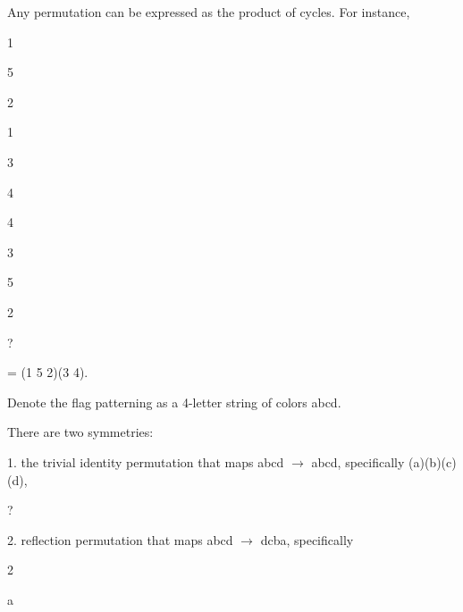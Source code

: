 \documentclass[a4paper,portrait,12pt]{article}
\begin{document}
\begin{flushleft}
Any permutation can be expressed as the product of cycles. For instance,
\end{flushleft}





1


5





2


1





3


4





4


3





5


2





?


= (1 5 2)(3 4).





\begin{flushleft}
Denote the flag patterning as a 4-letter string of colors abcd.
\end{flushleft}


\begin{flushleft}
There are two symmetries:
\end{flushleft}


\begin{flushleft}
1. the trivial identity permutation that maps abcd $\rightarrow$ abcd, specifically (a)(b)(c)(d),
\end{flushleft}


?


\begin{flushleft}
2. reflection permutation that maps abcd $\rightarrow$ dcba, specifically
\end{flushleft}





2





\begin{flushleft}
a
\end{flushleft}
\end{document}
